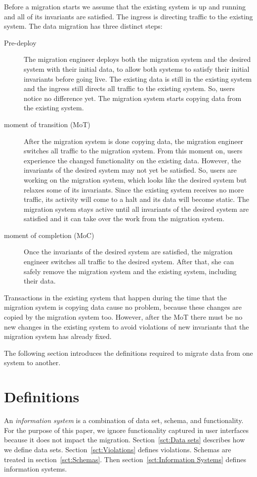 \documentclass[runningheads]{llncs}
\begin{document}
   Before a migration starts we assume that the existing system is up and running and all of its invariants are satisfied.
   The ingress is directing traffic to the existing system.
   The data migration has three distinct steps:
\begin{description}
\item[Pre-deploy]
      The migration engineer deploys both the migration system and the desired system with their initial data, to allow both systems to satisfy their initial invariants before going live.
      The existing data is still in the existing system and the ingress still directs all traffic to the existing system.
      So, users notice no difference yet.
      The migration system starts copying data from the existing system.
\item[moment of transition (MoT)]
      After the migration system is done copying data, the migration engineer switches all traffic to the migration system.
      From this moment on, users experience the changed functionality on the existing data.
      However, the invariants of the desired system may not yet be satisfied.
      So, users are working on the migration system, which looks like the desired system but relaxes some of its invariants.
      Since the existing system receives no more traffic, its activity will come to a halt and its data will become static.
      The migration system stays active until all invariants of the desired system are satisfied and it can take over the work from the migration system.
\item[moment of completion (MoC)]
      Once the invariants of the desired system are satisfied, the migration engineer switches all traffic to the desired system.
      After that, she can safely remove the migration system and the existing system, including their data.
\end{description}

   Transactions in the existing system that happen during the time that the migration system is copying data cause no problem,
   because these changes are copied by the migration system too.
   However, after the MoT there must be no new changes in the existing system
   to avoid violations of new invariants that the migration system has already fixed.
   
   The following section introduces the definitions required to migrate data from one system to another.

\section{Definitions}
\label{sct:Definitions}
   An {\em information system} is a combination of data set, schema, and functionality.
   For the purpose of this paper, we ignore functionality captured in user interfaces because it does not impact the migration.
   Section~\ref{sct:Data sets} describes how we define data sets. Section~\ref{sct:Violations} defines violations. Schemas are treated in section~\ref{sct:Schemas}.
   Then section~\ref{sct:Information Systems} defines information systems.
\end{document}
